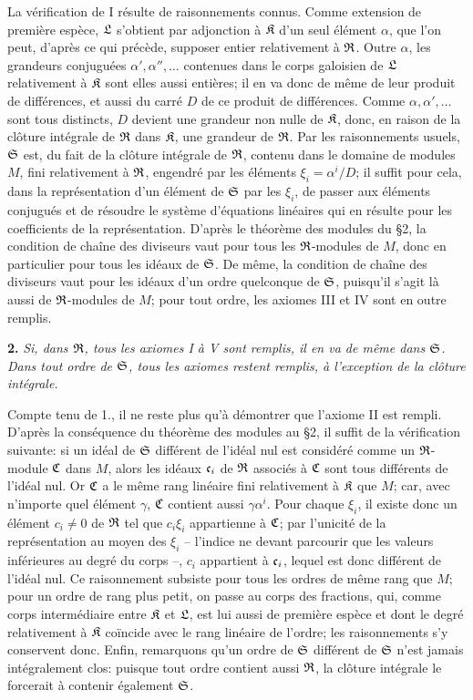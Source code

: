 La vérification de I résulte de raisonnements connus. Comme extension de première espèce, $\mathfrak{L}$ s'obtient par adjonction à $\mathfrak{K}$ d'un seul élément $\alpha$, que l'on peut, d'après ce qui précède, supposer entier relativement à $\mathfrak{R}$. Outre $\alpha$, les grandeurs conjuguées $\alpha',\alpha'',\ldots$ contenues dans le corps galoisien de $\mathfrak{L}$ relativement à $\mathfrak{K}$ sont elles aussi entières; il en va donc de même de leur produit de différences, et aussi du carré $D$ de ce produit de différences. Comme $\alpha,\alpha',\ldots$ sont tous distincts, $D$ devient une grandeur non nulle de $\mathfrak{K}$, donc, en raison de la clôture intégrale de $\mathfrak{R}$ dans $\mathfrak{K}$, une grandeur de $\mathfrak{R}$. Par les raisonnements usuels, $\mathfrak{S}$ est, du fait de la clôture intégrale de $\mathfrak{R}$, contenu dans le domaine de modules $M$, fini relativement à $\mathfrak{R}$, engendré par les éléments $\xi_i=\alpha^i/D$; il suffit pour cela, dans la représentation d'un élément de $\mathfrak{S}$ par les $\xi_i$, de passer aux éléments conjugués et de résoudre le système d'équations linéaires qui en résulte pour les coefficients de la représentation. D'après le théorème des modules du \S{}2, la condition de chaîne des diviseurs vaut pour tous les $\mathfrak{R}$-modules de $M$, donc en particulier pour tous les idéaux de $\mathfrak{S}$. De même, la condition de chaîne des diviseurs vaut pour les idéaux d'un ordre quelconque de $\mathfrak{S}$, puisqu'il s'agit là aussi de $\mathfrak{R}$-modules de $M$; pour tout ordre, les axiomes III et IV sont en outre remplis.

\textbf{2.} \emph{Si, dans $\mathfrak{R}$, tous les axiomes I à V sont remplis, il en va de même dans $\mathfrak{S}$. Dans tout ordre de $\mathfrak{S}$, tous les axiomes restent remplis, à l'exception de la clôture intégrale.}

Compte tenu de 1., il ne reste plus qu'à démontrer que l'axiome II est rempli. D'après la conséquence du théorème des modules au \S{}2, il suffit de la vérification suivante: si un idéal de $\mathfrak{S}$ différent de l'idéal nul est considéré comme un $\mathfrak{R}$-module $\mathfrak{C}$ dans $M$, alors les idéaux $\mathfrak{c}_i$ de $\mathfrak{R}$ associés à $\mathfrak{C}$ sont tous différents de l'idéal nul. Or $\mathfrak{C}$ a le même rang linéaire fini relativement à $\mathfrak{K}$ que $M$; car, avec n'importe quel élément $\gamma$, $\mathfrak{C}$ contient aussi $\gamma\alpha^i$. Pour chaque $\xi_i$, il existe donc un élément $c_i\ne0$ de $\mathfrak{R}$ tel que $c_i\xi_i$ appartienne à $\mathfrak{C}$; par l'unicité de la représentation au moyen des $\xi_i$ -- l'indice ne devant parcourir que les valeurs inférieures au degré du corps --, $c_i$ appartient à $\mathfrak{c}_i$, lequel est donc différent de l'idéal nul. Ce raisonnement subsiste pour tous les ordres de même rang que $M$; pour un ordre de rang plus petit, on passe au corps des fractions, qui, comme corps intermédiaire entre $\mathfrak{K}$ et $\mathfrak{L}$, est lui aussi de première espèce et dont le degré relativement à $\mathfrak{K}$ coïncide avec le rang linéaire de l'ordre; les raisonnements s'y conservent donc. Enfin, remarquons qu'un ordre de $\mathfrak{S}$ différent de $\mathfrak{S}$ n'est jamais intégralement clos: puisque tout ordre contient aussi $\mathfrak{R}$, la clôture intégrale le forcerait à contenir également $\mathfrak{S}$.

